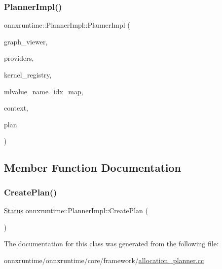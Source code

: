 \subsubsection{\texorpdfstring{Planner\+Impl()}{PlannerImpl()}}
{\footnotesize\ttfamily onnxruntime\+::\+Planner\+Impl\+::\+Planner\+Impl (\begin{DoxyParamCaption}\item[{const \mbox{\hyperlink{classonnxruntime_1_1GraphViewer}{onnxruntime\+::\+Graph\+Viewer}} \&}]{graph\+\_\+viewer,  }\item[{const \mbox{\hyperlink{classonnxruntime_1_1ExecutionProviders}{Execution\+Providers}} \&}]{providers,  }\item[{const \mbox{\hyperlink{classonnxruntime_1_1KernelRegistryManager}{Kernel\+Registry\+Manager}} \&}]{kernel\+\_\+registry,  }\item[{const \mbox{\hyperlink{classonnxruntime_1_1MLValueNameIdxMap}{M\+L\+Value\+Name\+Idx\+Map}} \&}]{mlvalue\+\_\+name\+\_\+idx\+\_\+map,  }\item[{const \mbox{\hyperlink{classonnxruntime_1_1ISequentialPlannerContext}{I\+Sequential\+Planner\+Context}} \&}]{context,  }\item[{\mbox{\hyperlink{structonnxruntime_1_1SequentialExecutionPlan}{Sequential\+Execution\+Plan}} \&}]{plan }\end{DoxyParamCaption})\hspace{0.3cm}{\ttfamily [inline]}}



\subsection{Member Function Documentation}
\mbox{\label{classonnxruntime_1_1PlannerImpl_ac293990d1378b99bf4e6c0fcb8ee5a23}} 
\subsubsection{\texorpdfstring{Create\+Plan()}{CreatePlan()}}
{\footnotesize\ttfamily \mbox{\hyperlink{classonnxruntime_1_1common_1_1Status}{Status}} onnxruntime\+::\+Planner\+Impl\+::\+Create\+Plan (\begin{DoxyParamCaption}{ }\end{DoxyParamCaption})}



The documentation for this class was generated from the following file\+:\begin{DoxyCompactItemize}
\item 
onnxruntime/onnxruntime/core/framework/\mbox{\hyperlink{allocation__planner_8cc}{allocation\+\_\+planner.\+cc}}\end{DoxyCompactItemize}
